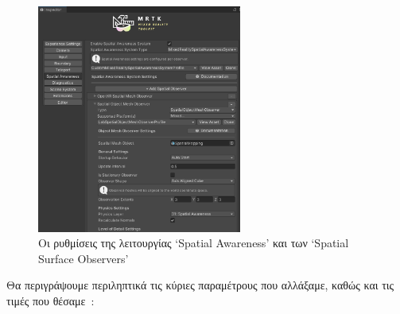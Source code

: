 \begin{figure}[!h]
    \centering
    \includegraphics[width=0.6\textwidth]{images/develop_inspMRTKSpatialAwareness.png}
    \caption{Οι ρυθμίσεις της λειτουργίας `Spatial Awareness' και των `Spatial Surface Observers'}\label{fig:developMRTKSpatialAwareness}
\end{figure}

Θα περιγράψουμε περιληπτικά τις κύριες παραμέτρους που αλλάξαμε, καθώς και τις τιμές που θέσαμε~\cite{davidklinems_2022_configuring}:

